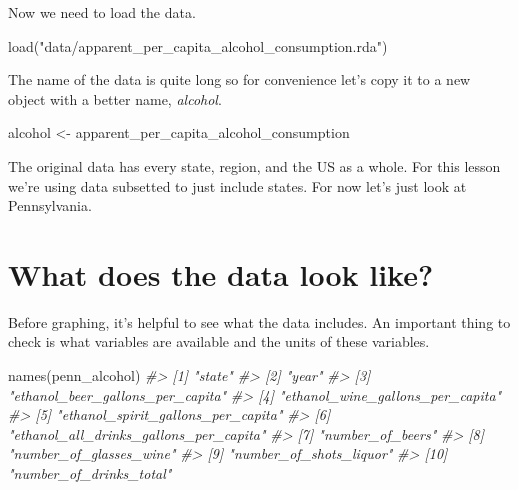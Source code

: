 \documentclass[
]{krantz}
\makeatletter
\newenvironment{Shaded}{\begin{snugshade}}{\end{snugshade}}
\newcommand{\CommentTok}[1]{\textcolor[rgb]{0.37,0.37,0.37}{\textit{#1}}}
\newcommand{\FunctionTok}[1]{\textcolor[rgb]{0,0,0}{#1}}
\newcommand{\NormalTok}[1]{#1}
\newcommand{\OtherTok}[1]{\textcolor[rgb]{0.37,0.37,0.37}{#1}}
\newcommand{\SpecialCharTok}[1]{\textcolor[rgb]{0,0,0}{#1}}
\newcommand{\StringTok}[1]{\textcolor[rgb]{0.5,0.5,0.5}{#1}}
\newenvironment{kframe}{%
\medskip{}
\setlength{\fboxsep}{.8em}
 \def\at@end@of@kframe{}%
 \ifinner\ifhmode%
  \def\at@end@of@kframe{\end{minipage}}%
  \begin{minipage}{\columnwidth}%
 \fi\fi%
 \def\FrameCommand##1{\hskip\@totalleftmargin \hskip-\fboxsep
 \colorbox{shadecolor}{##1}\hskip-\fboxsep
     \hskip-\linewidth \hskip-\@totalleftmargin \hskip\columnwidth}%
 \MakeFramed {\advance\hsize-\width
   \@totalleftmargin\z@ \linewidth\hsize
   \@setminipage}}%
 {\par\unskip\endMakeFramed%
 \at@end@of@kframe}
\renewenvironment{Shaded}{\begin{kframe}}{\end{kframe}}
\makeatother
\begin{document}
Now we need to load the data.

\begin{Shaded}
\begin{Highlighting}[]
\FunctionTok{load}\NormalTok{(}\StringTok{"data/apparent\_per\_capita\_alcohol\_consumption.rda"}\NormalTok{)}
\end{Highlighting}
\end{Shaded}

The name of the data is quite long so for convenience let's copy it to a new object with a better name, \emph{alcohol}.

\begin{Shaded}
\begin{Highlighting}[]
\NormalTok{alcohol }\OtherTok{\textless{}{-}}\NormalTok{ apparent\_per\_capita\_alcohol\_consumption}
\end{Highlighting}
\end{Shaded}

The original data has every state, region, and the US as a whole. For this lesson we're using data subsetted to just include states. For now let's just look at Pennsylvania.

\begin{Shaded}
\end{Shaded}

\hypertarget{what-does-the-data-look-like}{%
\section{What does the data look like?}\label{what-does-the-data-look-like}}

Before graphing, it's helpful to see what the data includes. An important thing to check is what variables are available and the units of these variables.

\begin{Shaded}
\begin{Highlighting}[]
\FunctionTok{names}\NormalTok{(penn\_alcohol)}
\CommentTok{\#\textgreater{}  [1] "state"                                }
\CommentTok{\#\textgreater{}  [2] "year"                                 }
\CommentTok{\#\textgreater{}  [3] "ethanol\_beer\_gallons\_per\_capita"      }
\CommentTok{\#\textgreater{}  [4] "ethanol\_wine\_gallons\_per\_capita"      }
\CommentTok{\#\textgreater{}  [5] "ethanol\_spirit\_gallons\_per\_capita"    }
\CommentTok{\#\textgreater{}  [6] "ethanol\_all\_drinks\_gallons\_per\_capita"}
\CommentTok{\#\textgreater{}  [7] "number\_of\_beers"                      }
\CommentTok{\#\textgreater{}  [8] "number\_of\_glasses\_wine"               }
\CommentTok{\#\textgreater{}  [9] "number\_of\_shots\_liquor"               }
\CommentTok{\#\textgreater{} [10] "number\_of\_drinks\_total"}
\end{Highlighting}
\end{Shaded}
\end{document}
